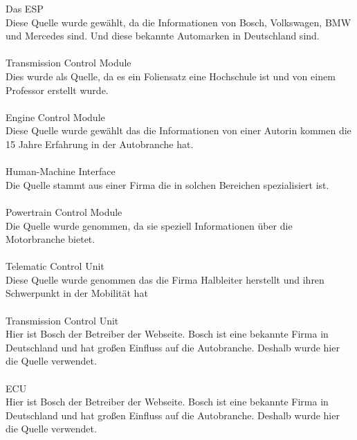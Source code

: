 Das ESP \cite{ESP.PB1}\\
Diese Quelle wurde gewählt, da die Informationen von Bosch, Volkswagen, BMW und Mercedes sind. Und diese bekannte Automarken in Deutschland sind.\\\\

Transmission Control Module \cite{transmissioncontrol.PB1}\\
Dies wurde als Quelle, da es ein Foliensatz eine Hochschule ist und von einem Professor erstellt wurde.\\\\

Engine Control Module \cite{enginecontrol.PB1}\\
Diese Quelle wurde gewählt das die Informationen von einer Autorin kommen die 15 Jahre Erfahrung in der Autobranche hat. \\\\

Human-Machine Interface \cite{HMI.PB2}\\
Die Quelle stammt aus einer Firma die in solchen Bereichen spezialisiert ist.\\\\

Powertrain Control Module \cite{PCM.PB1}\\
Die Quelle wurde genommen, da sie speziell Informationen über die Motorbranche bietet.\\\\

Telematic Control Unit \cite{telematiccontrol.PB1}\\
Diese Quelle wurde genommen das die Firma Halbleiter herstellt und ihren Schwerpunkt in der Mobilität hat\\\\

Transmission Control Unit \cite{transmissioncontrol.PB2}\\
Hier ist Bosch der Betreiber der Webseite. Bosch ist eine bekannte Firma in Deutschland und hat großen Einfluss auf die Autobranche. Deshalb wurde hier die Quelle verwendet.\\\\

ECU \cite{ECU.PB6}\\
Hier ist Bosch der Betreiber der Webseite. Bosch ist eine bekannte Firma in Deutschland und hat großen Einfluss auf die Autobranche. Deshalb wurde hier die Quelle verwendet.\\\\


